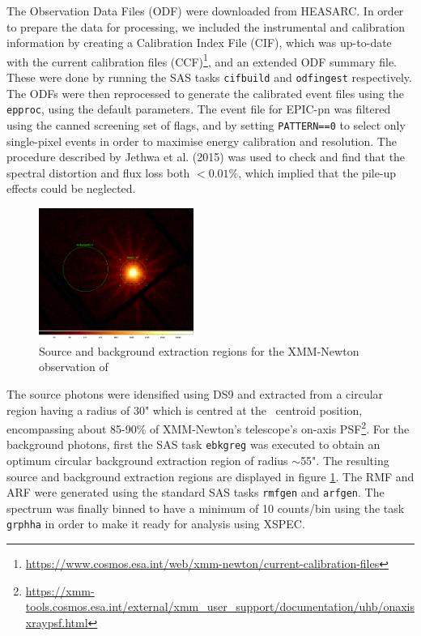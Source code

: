     	The Observation Data Files (ODF) were downloaded from HEASARC. In order to prepare the data for processing, we included the instrumental and calibration information by creating a Calibration Index File (CIF), which was up-to-date with the current calibration files (CCF)\footnote{\url{https://www.cosmos.esa.int/web/xmm-newton/current-calibration-files}}, and an extended ODF summary file. These were done by running the SAS tasks \texttt{cifbuild} and \texttt{odfingest} respectively. The ODFs were then reprocessed to generate the calibrated event files using the \texttt{epproc}, using the default parameters. The event file for EPIC-pn was filtered using the canned screening set of flags, and by setting \texttt{PATTERN==0} to select only single-pixel events in order to maximise energy calibration and resolution. The procedure described by Jethwa et al. (2015) \cite{jethwa2015pile} was used to check and find that the spectral distortion and flux loss both $<0.01\%$, which implied that the pile-up effects could be neglected.
	    \begin{figure}[!htb]
	        \centering
	        \includegraphics[width=0.45\textwidth]{figures/rx-j0925-7-4758_0111150101_src-bkg.png}
	        \caption{Source and background extraction regions for the XMM-Newton observation of \source}
	        \label{fig:src-bkg:pn}
	    \end{figure}
    
    	The source photons were idensified using DS9 and extracted from a circular region having a radius of 30" which is centred at the \source\ centroid position, encompassing about 85-90\% of XMM-Newton's telescope's on-axis PSF\footnote{\url{https://xmm-tools.cosmos.esa.int/external/xmm_user_support/documentation/uhb/onaxisxraypsf.html}}. For the background photons, first the SAS task \texttt{ebkgreg} was executed to obtain an optimum circular background extraction region of radius $\sim$55". The resulting source and background extraction regions are displayed in figure \ref{fig:src-bkg:pn}. The RMF and ARF were generated using the standard SAS tasks \texttt{rmfgen} and \texttt{arfgen}. The spectrum was finally binned to have a minimum of 10 counts/bin using the task \texttt{grphha} in order to make it ready for analysis using XSPEC.
    
